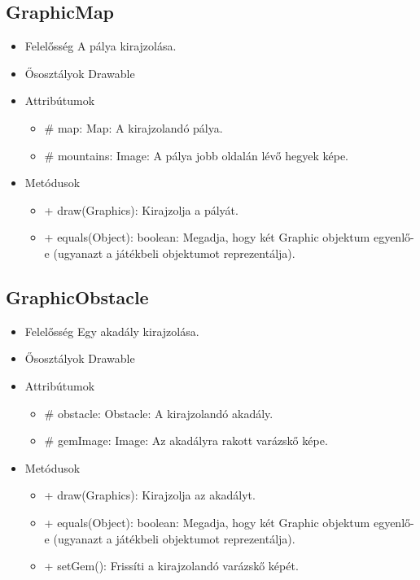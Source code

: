 \subsection{GraphicMap}
\begin{itemize}
\item Felelősség \newline
A pálya kirajzolása.
\item Ősosztályok\newline
Drawable
\item Attribútumok
	\begin{itemize}
		\item \# map: Map: A kirajzolandó pálya.
		\item \# mountains: Image: A pálya jobb oldalán lévő hegyek képe.
	\end{itemize}
\item Metódusok
	\begin{itemize}
		\item + draw(Graphics): Kirajzolja a pályát.
		\item + equals(Object): boolean: Megadja, hogy két Graphic objektum egyenlő-e (ugyanazt a játékbeli objektumot reprezentálja).
	\end{itemize}
\end{itemize}

\subsection{GraphicObstacle}
\begin{itemize}
\item Felelősség \newline
Egy akadály kirajzolása.
\item Ősosztályok \newline
Drawable
\item Attribútumok
	\begin{itemize}
		\item \# obstacle: Obstacle: A kirajzolandó akadály.
		\item \# gemImage: Image: Az akadályra rakott varázskő képe.
	\end{itemize}
\item Metódusok
	\begin{itemize}
		\item + draw(Graphics): Kirajzolja az akadályt.
		\item + equals(Object): boolean: Megadja, hogy két Graphic objektum egyenlő-e (ugyanazt a játékbeli objektumot reprezentálja).
		\item + setGem(): Frissíti a kirajzolandó varázskő képét.
	\end{itemize}
\end{itemize}

